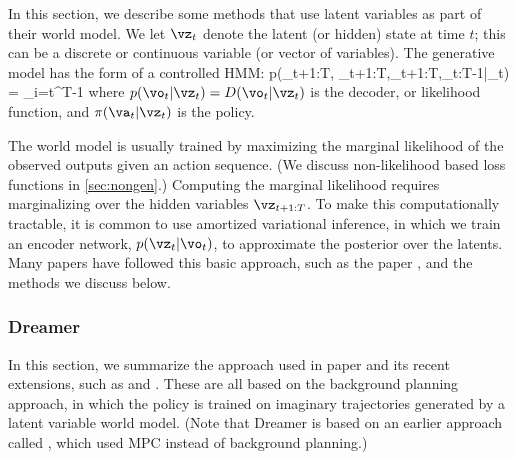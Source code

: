 In this section, we describe some methods
that use latent variables as part of their world model.
We let $\vz_t$ denote the latent (or hidden) state at time $t$;
this can be a discrete or continuous variable (or vector
of variables).
The generative model has the form of a controlled HMM:
\be
p(\vo_{t+1:T}, \vz_{t+1:T},\vr_{t+1:T},\va_{t:T-1}|\vz_t) =
\prod_{i=t}^{T-1}
\left[
  \pi(\va_i | \vz_{i})
M(\vz_{i+1}|\vz_{i}, \va_i)
R(r_{i}|\vz_{i+1}, \va_i)
D(\vo_{i}|\vz_{i+1})
\right]
\label{eqn:unrollLatent}
\ee
where $p(\vo_t|\vz_t)=D(\vo_t|\vz_t)$ is the decoder,
or likelihood function,
and $\pi(\va_t|\vz_t)$ is the policy.

The world model is usually trained by maximizing the
marginal likelihood
of the observed outputs given an action sequence.
(We discuss non-likelihood based loss functions
in \cref{sec:nongen}.)
Computing the marginal likelihood
 requires marginalizing over the hidden variables
$\vz_{t+1:T}$. To make this computationally tractable,
it is common to use amortized variational inference,
in which we
train an encoder network,
$p(\vz_t|\vo_t)$, to approximate the posterior
over the latents.
Many papers have followed this basic approach,
such as 
the  paper  \citep{worldModels},
and the methods we discuss below.



\subsubsection{Dreamer}
\label{sec:dreamer}

In this section, we summarize the approach used in
 paper \citep{dreamer}
and its recent extensions,
such as  \citep{dreamerv2}
and  \citep{dreamerv3}.
These are all based on the background planning approach,
in which the policy is trained on imaginary
trajectories generated by a latent variable world model.
(Note that Dreamer is based on an earlier approach
called   \citep{planet},
which used MPC instead of background planning.)

